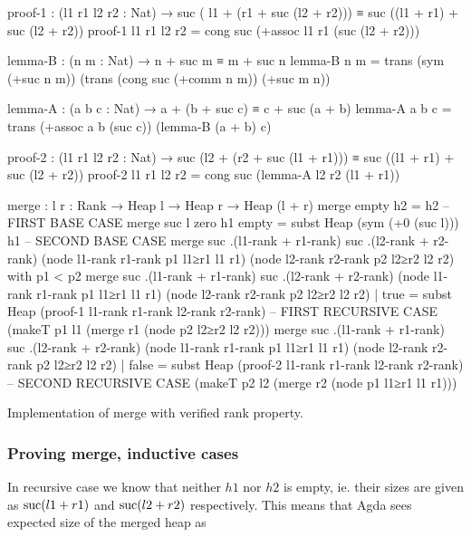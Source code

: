\begin{listing}[thb!]
\begin{code}
proof-1 : (l1 r1 l2 r2 : Nat) → suc ( l1 + (r1 + suc (l2 + r2)))
                              ≡ suc ((l1 + r1) + suc (l2 + r2))
proof-1 l1 r1 l2 r2 = cong suc (+assoc l1 r1 (suc (l2 + r2)))

lemma-B : (n m : Nat) → n + suc m ≡ m + suc n
lemma-B n m = trans (sym (+suc n m)) (trans (cong suc (+comm n m)) (+suc m n))

lemma-A : (a b c : Nat) → a + (b + suc c) ≡ c + suc (a + b)
lemma-A a b c = trans (+assoc a b (suc c)) (lemma-B (a + b) c)

proof-2 : (l1 r1 l2 r2 : Nat) → suc (l2 + (r2  + suc (l1 + r1)))
                              ≡ suc ((l1 + r1) + suc (l2 + r2))
proof-2 l1 r1 l2 r2 = cong suc (lemma-A l2 r2 (l1 + r1))

merge : {l r : Rank} → Heap l → Heap r → Heap (l + r)
merge empty h2 = h2 -- FIRST BASE CASE
merge {suc l} {zero} h1 empty
  = subst Heap (sym (+0 (suc l))) h1 -- SECOND BASE CASE
merge {suc .(l1-rank + r1-rank)} {suc .(l2-rank + r2-rank)}
  (node {l1-rank} {r1-rank} p1 l1≥r1 l1 r1)
  (node {l2-rank} {r2-rank} p2 l2≥r2 l2 r2)
  with p1 < p2
merge {suc .(l1-rank + r1-rank)} {suc .(l2-rank + r2-rank)}
  (node {l1-rank} {r1-rank} p1 l1≥r1 l1 r1)
  (node {l2-rank} {r2-rank} p2 l2≥r2 l2 r2)
  | true
  = subst Heap
          (proof-1 l1-rank r1-rank l2-rank r2-rank) -- FIRST RECURSIVE CASE
          (makeT p1 l1 (merge r1 (node p2 l2≥r2 l2 r2)))
merge {suc .(l1-rank + r1-rank)} {suc .(l2-rank + r2-rank)}
  (node {l1-rank} {r1-rank} p1 l1≥r1 l1 r1)
  (node {l2-rank} {r2-rank} p2 l2≥r2 l2 r2)
  | false
  = subst Heap
          (proof-2 l1-rank r1-rank l2-rank r2-rank) -- SECOND RECURSIVE CASE
          (makeT p2 l2 (merge r2 (node p1 l1≥r1 l1 r1)))
\end{code}
\caption{Implementation of merge with verified rank property.}\label{lst:rank-proof-merge-two-pass}
\end{listing}

\subsubsection{Proving merge, inductive cases}

In recursive case we know that neither $h1$ nor $h2$ is empty, ie. their sizes are given as $\operatorname{suc} (l1 + r1)$ and $\operatorname{suc} (l2 + r2)$ respectively. This means that Agda sees expected size of the merged heap as

